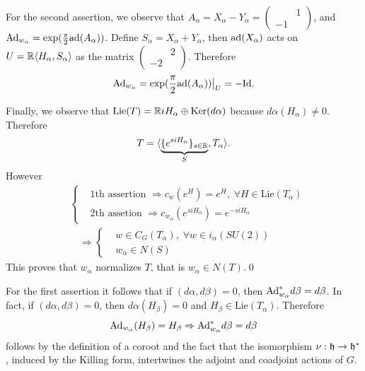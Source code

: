For the second assertion, we observe that 
$A_\alpha=X_\alpha-Y_\alpha=(\begin{smallmatrix}&1\\-1&\end{smallmatrix})$, and 
$\text{Ad}_{w_\alpha} = \exp(\tfrac{\pi}{2}\text{ad}(A_\alpha))$. Define $S_\alpha = X_\alpha+Y_\alpha$, then 
$\text{ad}(X_\alpha)$ acts on $U=\mathbb{R}\langle H_\alpha, S_\alpha\rangle$ as the matrix 
$(\begin{smallmatrix}&2\\-2&\end{smallmatrix})$. Therefore
\begin{equation}
  \text{Ad}_{w_\alpha}=\exp(\frac{\pi}{2}\text{ad}(A_\alpha))\big|_U = -\text{Id}.
\end{equation}

Finally, we observe that $\text{Lie}(T)=\mathbb{R} iH_\alpha\oplus \text{Ker}(d\alpha)$ because $d\alpha(H_\alpha)\neq0$. Therefore 
\begin{equation}
    T=\langle \underset{S}{\underbrace{\{e^{s iH_\alpha}\}_{s\in\mathbb{R}}}}, T_\alpha \rangle.
\end{equation}
However
\begin{equation}
    \begin{split}
        & \left\{\begin{aligned}
        &1\text{th assertion }\Rightarrow c_w(e^H)=e^H,\;\forall H\in\text{Lie}(T_\alpha)\\
        &2\text{th assetion }\Rightarrow c_{w_\alpha}(e^{siH_\alpha})=e^{-siH_\alpha}
    \end{aligned}\right. \\
     &\quad\Longrightarrow\left\{\begin{aligned}
        & w\in C_G(T_\alpha),\;\forall w\in i_\alpha(SU(2))\\
        & w_\alpha\in N(S)
     \end{aligned}\right.
\end{split}
\end{equation}
This proves that $w_\alpha$ normalizes $T$, that is $w_\alpha\in N(T)$.\qed

For the first assertion it follows that if $(d\alpha,d\beta)=0$, then $\text{Ad}_{w_\alpha}^*d\beta=d\beta$. In fact, if
$(d\alpha,d\beta)=0$, then $d\alpha(H_\beta)=0$ and $H_\beta\in\text{Lie}(T_\alpha)$. Therefore 
\begin{equation}
    \text{Ad}_{w_\alpha}(H_\beta)=H_\beta\Rightarrow \text{Ad}_{w_\alpha}^*d\beta=d\beta
\end{equation}
follows by the definition of a coroot and the fact that the isomorphism $\nu:\mathfrak{h}\to\mathfrak{h}^*$, induced by the 
Killing form, intertwines the adjoint and coadjoint actions of $G$.\par 

